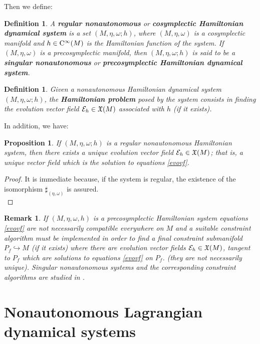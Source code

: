 \documentclass[12pt]{report}
\newtheorem{prop}[teor]{Proposition}
\newtheorem{definition}[teor]{Definition}
\newtheorem{remark}[teor]{Remark}
\def\qed{\ifvmode\removelastskip\fi
{\unskip\nobreak\hfil\penalty50\hbox{}\nobreak\hfil
\hbox{\vrule height1.2ex width1.2ex}\parfillskip=0pt
\finalhyphendemerits=0 \par\smallskip}}
\def\vf{\mathfrak X}
\def\Cinfty{{\rm C}^\infty}
\begin{document}
Then we define:

\begin{definition}
A \textbf{regular nonautonomous} or \textbf{cosymplectic Hamiltonian dynamical system}
is a set $(M,\eta,\omega;h)$,
where $(M,\eta,\omega)$ is a cosymplectic manifold 
and $h\in\Cinfty(M)$ is the Hamiltonian function of the system.
If $(M,\eta,\omega)$ is a precosymplectic manifold, then $(M,\eta,\omega;h)$
is said to be a \textbf{singular nonautonomous} or \textbf{precosymplectic Hamiltonian dynamical system}.
\label{stdhr}
\end{definition}

\begin{definition}
Given a nonautonomous Hamiltonian dynamical system $(M,\eta,\omega;h)$, 
the \textbf{Hamiltonian problem} posed by  the system
consists in finding the evolution vector field ${\cal E}_h \in \vf (M)$
associated with $h$ (if it exists).
\end{definition}

In addition, we have:

\begin{prop}
\label{teo-evoeqs}
If $(M,\eta,\omega;h)$ is a regular nonautonomous Hamiltonian system, 
then there exists a unique evolution vector field ${\cal E}_h\in\vf(M)$;
that is, a unique vector field which is the solution to equations \eqref{evovf}.
\end{prop}
\begin{proof}
It is immediate because,
if the system is regular, the existence of the isomorphism $\sharp_{(\eta,\omega)}$ is assured.
\\ \qed \end{proof}

\begin{remark}{\rm 
If $(M,\eta,\omega,h)$ is a precosymplectic Hamiltonian system
equations \eqref{evovf} are not necessarily compatible everywhere on $M$ 
and a suitable {\sl constraint algorithm} must be implemented in order to find 
a {\sl final constraint submanifold} $P_f\hookrightarrow M$
(if it exists) where there are evolution vector fields ${\cal E}_h\in\vf(M)$,
tangent to $P_f$ which are solutions to equations \eqref{evovf} on $P_f$.
(they are not necessarily unique).
Singular nonautonomous systems and the
corresponding constraint algorithms are studied in \cite{CF-93,CLM-94,LMM-96,LMM-96b,LMMMR-02,Vig-00}.
}\end{remark}


\section{Nonautonomous Lagrangian dynamical systems}
\end{document}

